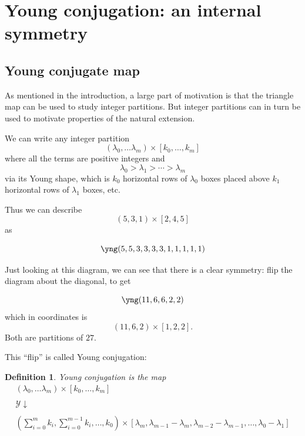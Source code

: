 \documentclass[12pt,oneside,openany]{article}
\newtheorem{theorem}{Theorem}[section]
\newtheorem{definition}[theorem]{Definition}
\begin{document}


\section{Young conjugation: an internal symmetry}\label{Young conjugation: An Internal Symmetry}

\subsection{Young conjugate map}

As mentioned in the introduction, a large part of motivation is that the triangle map can be used to study integer partitions.  But integer partitions can in turn be used to motivate properties of the natural extension. 

We can write any integer partition $$(\lambda_0, \ldots \lambda_m) \times [k_0, \ldots , k_m]$$
where all the terms are positive integers and 
$$\lambda_0>\lambda_1 > \cdots > \lambda_m $$
via its Young shape, which is $k_0$ horizontal  rows of  $\lambda_0$ boxes placed above $k_1$ horizontal  rows of  $\lambda_1$ boxes, etc.

Thus we can describe 
$$(5,3, 1) \times [2, 4, 5]$$ as 

   
 \[
        \yng(5,5,3,3,3,3,1,1,1,1,1)
    \]

Just looking at this diagram, we can see that there is a clear symmetry: flip the diagram about the diagonal, to get 


   
 \[
       \yng(11,6,6,2,2)
    \]
  which in coordinates is 
  $$(11, 6, 2) \times [1,2,2].$$
  Both are partitions of $27$.
  
  This ``flip'' is called Young conjugation:
  
  \begin{definition} Young conjugation is the map 
  $$\begin{array}{c}  (\lambda_0, \ldots \lambda_m) \times [k_0, \ldots , k_m] \\ \\
  \mathcal{Y} \downarrow \\ \\
   \left( \sum_{i=0}^m  k_i,  \sum_{i=0}^{m-1}  k_i, \ldots,k_0\right) \times [\lambda_m, \lambda_{m-1}-\lambda_m, \lambda_{m-2}- \lambda_{m-1}, 
  \ldots , \lambda_0 - \lambda_1]   \end{array}   $$
    \end{definition}
    
\end{document}
